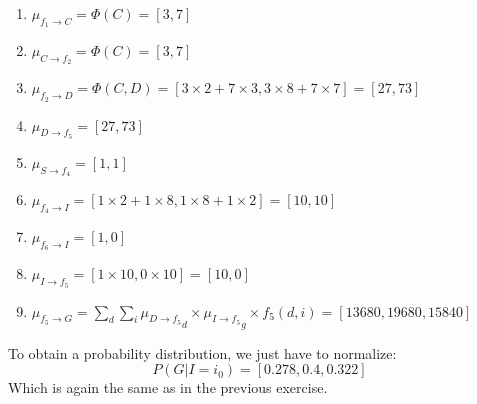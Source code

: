 \documentclass[a4paper, 10pt]{article}
\begin{document}
\begin{enumerate}
    \item $\mu_{f_1\rightarrow C} = \Phi(C) = \left[3, 7\right]$
    \item $\mu_{C\rightarrow f_2} = \Phi(C) = \left[3, 7\right]$
    \item $\mu_{f_2\rightarrow D} = \Phi(C,D) = \left[3\times 2+ 7\times 3, 3\times 8 + 7 \times 7\right] = \left[27, 73\right]$
    \item $\mu_{D\rightarrow f_5} = \left[27, 73\right]$
    \item $\mu_{S\rightarrow f_4} = \left[1, 1\right]$
    \item $\mu_{f_4\rightarrow I} = \left[1\times2+1\times8, 1\times8 + 1\times 2\right] = \left[10, 10\right]$
    \item $\mu_{f_6\rightarrow I} = \left[1, 0\right]$
    \item $\mu_{I\rightarrow f_5} = \left[1\times10, 0\times10\right] = \left[10, 0\right]$
    \item $\mu_{f_5\rightarrow G} = \sum_d \sum_i  {\mu_{D\rightarrow f_5}}_d \times {\mu_{I\rightarrow f_5}}_g \times f_5(d,i) = \left[13680, 19680, 15840\right]$
\end{enumerate}
To obtain a probability distribution, we just have to normalize:
$$
P(G\vert I=i_0) = \left[0.278, 0.4, 0.322\right]
$$
Which is again the same as in the previous exercise.
\end{document}
